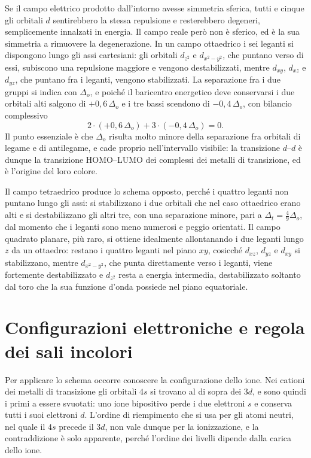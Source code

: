 Se il campo elettrico prodotto dall'intorno avesse simmetria sferica, tutti e cinque gli orbitali $d$ sentirebbero la stessa repulsione e resterebbero degeneri, semplicemente innalzati in energia.
Il campo reale però non è sferico, ed è la sua simmetria a rimuovere la degenerazione.
In un campo ottaedrico i sei leganti si dispongono lungo gli assi cartesiani: gli orbitali $d_{z^2}$ e $d_{x^2-y^2}$, che puntano verso di essi, subiscono una repulsione maggiore e vengono destabilizzati, mentre $d_{xy}$, $d_{xz}$ e $d_{yz}$, che puntano fra i leganti, vengono stabilizzati.
La separazione fra i due gruppi si indica con $\Delta_o$, e poiché il baricentro energetico deve conservarsi i due orbitali alti salgono di $+0{,}6\,\Delta_o$ e i tre bassi scendono di $-0{,}4\,\Delta_o$, con bilancio complessivo
\begin{equation}
    2 \cdot (+0{,}6\,\Delta_o) + 3 \cdot (-0{,}4\,\Delta_o) = 0 .
    \label{eq:baricentro}
\end{equation}
Il punto essenziale è che $\Delta_o$ risulta molto minore della separazione fra orbitali di legame e di antilegame, e cade proprio nell'intervallo visibile: la transizione $d$--$d$ è dunque la transizione HOMO--LUMO dei complessi dei metalli di transizione, ed è l'origine del loro colore.

Il campo tetraedrico produce lo schema opposto, perché i quattro leganti non puntano lungo gli assi: si stabilizzano i due orbitali che nel caso ottaedrico erano alti e si destabilizzano gli altri tre, con una separazione minore, pari a $\Delta_t = \tfrac{4}{9}\Delta_o$, dal momento che i leganti sono meno numerosi e peggio orientati.
Il campo quadrato planare, più raro, si ottiene idealmente allontanando i due leganti lungo $z$ da un ottaedro: restano i quattro leganti nel piano $xy$, cosicché $d_{xz}$, $d_{yz}$ e $d_{xy}$ si stabilizzano, mentre $d_{x^2-y^2}$, che punta direttamente verso i leganti, viene fortemente destabilizzato e $d_{z^2}$ resta a energia intermedia, destabilizzato soltanto dal toro che la sua funzione d'onda possiede nel piano equatoriale.

\section{Configurazioni elettroniche e regola dei sali incolori}

Per applicare lo schema occorre conoscere la configurazione dello ione.
Nei cationi dei metalli di transizione gli orbitali $4s$ si trovano al di sopra dei $3d$, e sono quindi i primi a essere svuotati: uno ione bipositivo perde i due elettroni $s$ e conserva tutti i suoi elettroni $d$.
L'ordine di riempimento che si usa per gli atomi neutri, nel quale il $4s$ precede il $3d$, non vale dunque per la ionizzazione, e la contraddizione è solo apparente, perché l'ordine dei livelli dipende dalla carica dello ione.

